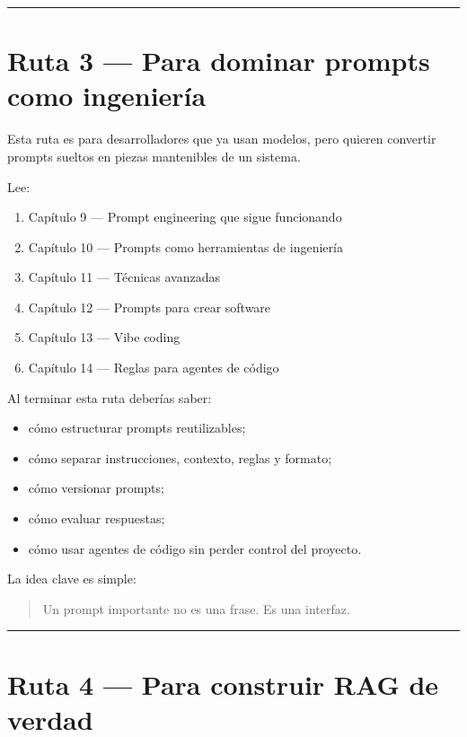 \begin{center}\rule{0.5\linewidth}{0.5pt}\end{center}

\section{Ruta 3 --- Para dominar prompts como
ingeniería}\label{ruta-3-para-dominar-prompts-como-ingenieruxeda}

Esta ruta es para desarrolladores que ya usan modelos, pero quieren
convertir prompts sueltos en piezas mantenibles de un sistema.

Lee:

\begin{enumerate}
\def\labelenumi{\arabic{enumi}.}
\tightlist
\item
  Capítulo 9 --- Prompt engineering que sigue funcionando
\item
  Capítulo 10 --- Prompts como herramientas de ingeniería
\item
  Capítulo 11 --- Técnicas avanzadas
\item
  Capítulo 12 --- Prompts para crear software
\item
  Capítulo 13 --- Vibe coding
\item
  Capítulo 14 --- Reglas para agentes de código
\end{enumerate}

Al terminar esta ruta deberías saber:

\begin{itemize}
\tightlist
\item
  cómo estructurar prompts reutilizables;
\item
  cómo separar instrucciones, contexto, reglas y formato;
\item
  cómo versionar prompts;
\item
  cómo evaluar respuestas;
\item
  cómo usar agentes de código sin perder control del proyecto.
\end{itemize}

La idea clave es simple:

\begin{quote}
Un prompt importante no es una frase. Es una interfaz.
\end{quote}

\begin{center}\rule{0.5\linewidth}{0.5pt}\end{center}

\section{Ruta 4 --- Para construir RAG de
verdad}\label{ruta-4-para-construir-rag-de-verdad}

